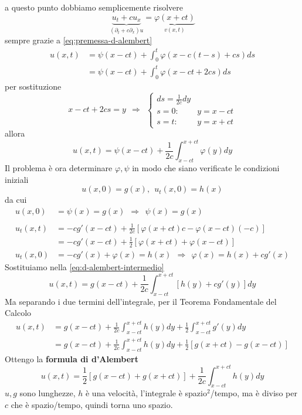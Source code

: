\documentclass[10pt,a4paper,twoside,openright]{book}
\begin{document}
a questo punto dobbiamo semplicemente risolvere
\begin{equation*}
	\underbrace{u_{t} +cu_{x}}_{( \partial _{t} +c\partial _{x}) u} =\underbrace{\varphi ( x+ct)}_{v( x,t)}
\end{equation*}
sempre grazie a \eqref{eq:premessa-d-alembert}
\begin{align*}
	u( x,t) & =\psi ( x-ct) +\int ^{t}_{0} \varphi ( x-c( t-s) +cs) ds \\
	        & =\psi ( x-ct) +\int ^{t}_{0} \varphi ( x-ct+2cs) ds      
\end{align*}
per sostituzione
\begin{equation*}
	x-ct+2cs=y\ \ \Rightarrow \ \ \begin{cases}
	ds=\frac{1}{2c} dy & \\
	s=0: & y=x-ct\\
	s=t: & y=x+ct
	\end{cases}
\end{equation*}
allora
\begin{equation}
	u( x,t) =\psi ( x-ct) +\frac{1}{2c}\int ^{x+ct}_{x-ct} \varphi ( y) dy
	\label{eq:d-alembert-intermedio}
\end{equation}
Il problema è ora determinare $\varphi ,\psi $ in modo che siano verificate le condizioni iniziali
\begin{equation*}
	u( x,0) =g( x) ,\ \ u_{t}( x,0) =h( x)
\end{equation*}
da cui
\begin{align*}
	u( x,0)     & =\psi ( x) =g( x) \ \ \Rightarrow \ \ \boxed{\psi ( x) =g( x)}                          \\
	            &                                                                                         \\
	u_{t}( x,t) & =-cg'( x-ct) +\frac{1}{2c}[ \varphi ( x+ct) c-\varphi ( x-ct)( -c)]                     \\
	            & =-cg'( x-ct) +\frac{1}{2}[ \varphi ( x+ct) +\varphi ( x-ct)]                            \\
	u_{t}( x,0) & =-cg'( x) +\varphi ( x) =h( x) \ \ \Rightarrow \ \ \boxed{\varphi ( x) =h( x) +cg'( x)} 
\end{align*}
Sostituiamo nella \eqref{eq:d-alembert-intermedio}
\begin{equation*}
	u( x,t) =g( x-ct) +\frac{1}{2c}\int ^{x+ct}_{x-ct}[ h( y) +cg'( y)] dy
\end{equation*}
Ma separando i due termini dell'integrale, per il Teorema Fondamentale del Calcolo
\begin{align*}
	u( x,t) & =g( x-ct) +\frac{1}{2c}\int ^{x+ct}_{x-ct} h( y) dy+\frac{1}{2}\int ^{x+ct}_{x-ct} g'( y) dy \\
	        & =g( x-ct) +\frac{1}{2c}\int ^{x+ct}_{x-ct} h( y) dy+\frac{1}{2}[ g( x+ct) -g( x-ct)]         
\end{align*}
Ottengo la \textbf{formula di d'Alembert}
\begin{equation}
	\boxed{u( x,t) =\frac{1}{2}[ g( x-ct) +g( x+ct)] +\frac{1}{2c}\int ^{x+ct}_{x-ct} h( y) dy}
\end{equation}
$u,g$ sono lunghezze, $h$ è una velocità, l'integrale è spazio$^{2}$/tempo, ma è diviso per $c$ che è spazio/tempo, quindi torna uno spazio.
\end{document}
